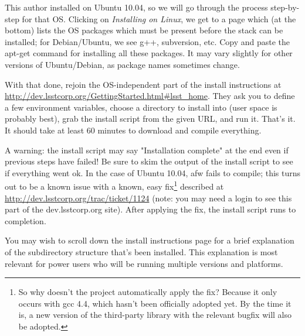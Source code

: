 \documentclass{book}
\begin{document}
This author installed on Ubuntu 10.04, so we will go through the
process step-by-step for that OS.  Clicking on {\it Installing on
  Linux}, we get to a page which (at the bottom) lists the OS packages
which must be present before the stack can be installed; for
Debian/Ubuntu, we see g++, subversion, etc.  Copy and paste the
apt-get command for installing all these packages. It may vary
slightly for other versions of Ubuntu/Debian, as package names
sometimes change.

With that done, rejoin the OS-independent part of the install
instructions at
\url{http://dev.lsstcorp.org/GettingStarted.html#lsst_home}.  They ask
you to define a few environment variables, choose a directory to
install into (user space is probably best), grab the install script
from the given URL, and run it.  That's it.  It should take at least
60 minutes to download and compile everything. 

A warning: the install script may say "Installation complete" at the
end even if previous steps have failed!  Be sure to skim the output of
the install script to see if everything went ok.  In the case of
Ubuntu 10.04, afw fails to compile; this turns out to be a known issue
with a known, easy fix\footnote{So why doesn't the project
  automatically apply the fix?  Because it only occurs with gcc 4.4,
  which hasn't been officially adopted yet. By the time it is, a new
  version of the third-party library with the relevant bugfix will
  also be adopted.} described at
\url{http://dev.lsstcorp.org/trac/ticket/1124} (note: you may need a
login to see this part of the dev.lsstcorp.org site).  After applying
the fix, the install script runs to completion.

You may wish to scroll down the install instructions page for a brief
explanation of the subdirectory structure that's been installed.  This
explanation is most relevant for power users who will be running
multiple versions and platforms.
\end{document}
